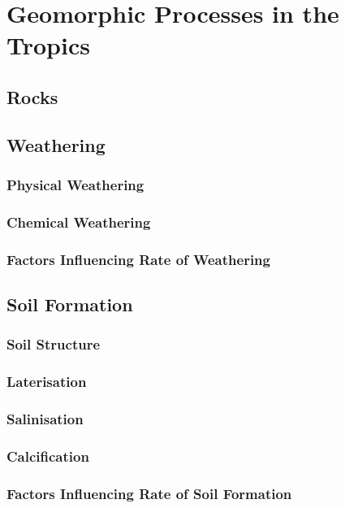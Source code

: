 \documentclass[../main]{subfiles}
\begin{document}
\section{Geomorphic Processes in the Tropics}

	\subsection{Rocks}

	\subsection{Weathering}

	\subsubsection{Physical Weathering}

	\subsubsection{Chemical Weathering}

	\subsubsection{Factors Influencing Rate of Weathering}

	\subsection{Soil Formation}

	\subsubsection{Soil Structure}

	\subsubsection{Laterisation}

	\subsubsection{Salinisation}

	\subsubsection{Calcification}

	\subsubsection{Factors Influencing Rate of Soil Formation}
\end{document}
